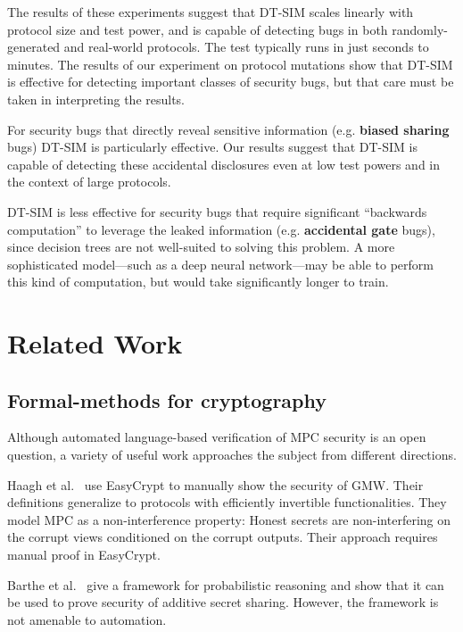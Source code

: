 \documentclass[compsoc, conference, a4paper, 10pt, times]{IEEEtran}
\newcommand{\toolname}{\textsc{DT-SIM}\xspace}
\begin{document}
The results of these experiments suggest that \toolname scales linearly with protocol size and test power, and is capable of detecting bugs in both randomly-generated and real-world protocols. The test typically runs in just seconds to minutes. The results of our experiment on protocol mutations show that \toolname is effective for detecting important classes of security bugs, but that care must be taken in interpreting the results.

For security bugs that directly reveal sensitive information (e.g. \textbf{biased sharing} bugs) \toolname is particularly effective. Our results suggest that \toolname is capable of detecting these accidental disclosures even at low test powers and in the context of large protocols.

\toolname is less effective for security bugs that require significant ``backwards computation'' to leverage the leaked information (e.g. \textbf{accidental gate} bugs), since decision trees are not well-suited to solving this problem. A more sophisticated model---such as a deep neural network---may be able to perform this kind of computation, but would take significantly longer to train.



\section{Related Work}

\subsection{Formal-methods for cryptography}
Although automated language-based verification of MPC security is an open question,
a variety of useful work approaches the subject from different directions.

Haagh et al.~\cite{haagh2018computer} %
use EasyCrypt to manually show the security of GMW.
Their definitions generalize to protocols with efficiently invertible functionalities.
They model MPC as a non-interference property: Honest secrets are non-interfering on the corrupt views conditioned on the corrupt outputs.
Their approach requires manual proof in EasyCrypt.

Barthe et al.~\cite{barthe2019probabilistic} %
give a framework for probabilistic reasoning and show that it can be used to prove security of additive secret sharing.
However, the framework is not amenable to automation.
\end{document}

